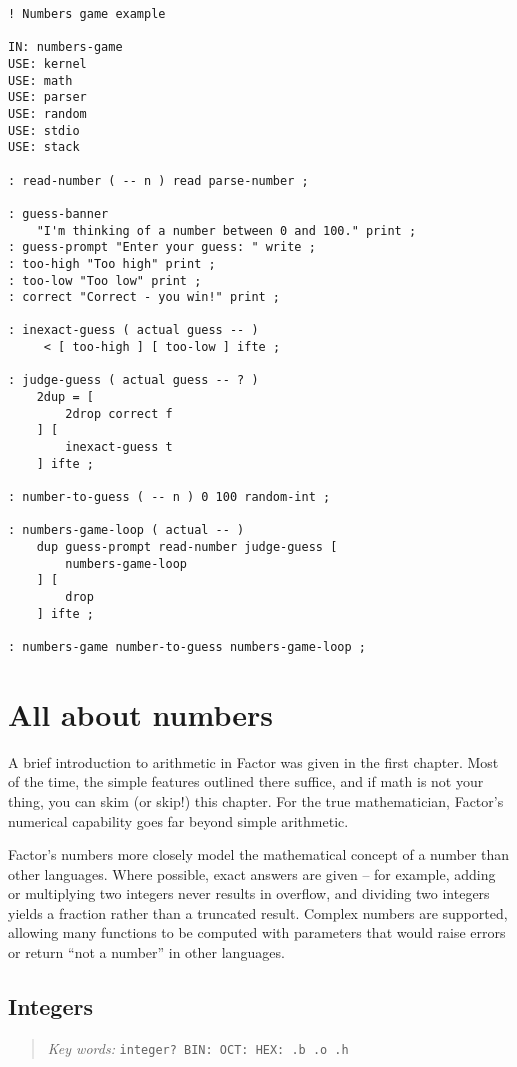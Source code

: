 \documentclass[english]{book}
\newcommand{\chapkeywords}[1]{%
\begin{quote}
\emph{Key words:} \texttt{#1}
\end{quote}
}
\begin{document}
\begin{verbatim}
! Numbers game example

IN: numbers-game
USE: kernel
USE: math
USE: parser
USE: random
USE: stdio
USE: stack

: read-number ( -- n ) read parse-number ;

: guess-banner
    "I'm thinking of a number between 0 and 100." print ;
: guess-prompt "Enter your guess: " write ;
: too-high "Too high" print ;
: too-low "Too low" print ;
: correct "Correct - you win!" print ;

: inexact-guess ( actual guess -- )
     < [ too-high ] [ too-low ] ifte ;

: judge-guess ( actual guess -- ? )
    2dup = [
        2drop correct f
    ] [
        inexact-guess t
    ] ifte ;

: number-to-guess ( -- n ) 0 100 random-int ;

: numbers-game-loop ( actual -- )
    dup guess-prompt read-number judge-guess [
        numbers-game-loop
    ] [
        drop
    ] ifte ;

: numbers-game number-to-guess numbers-game-loop ;
\end{verbatim}

\chapter{All about numbers}

A brief introduction to arithmetic in Factor was given in the first chapter. Most of the time, the simple features outlined there suffice, and if math is not your thing, you can skim (or skip!) this chapter. For the true mathematician, Factor's numerical capability goes far beyond simple arithmetic.

Factor's numbers more closely model the mathematical concept of a number than other languages. Where possible, exact answers are given -- for example, adding or multiplying two integers never results in overflow, and dividing two integers yields a fraction rather than a truncated result. Complex numbers are supported, allowing many functions to be computed with parameters that would raise errors or return ``not a number'' in other languages.

\section{Integers}

\chapkeywords{integer?~BIN: OCT: HEX: .b .o .h}
\end{document}
